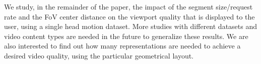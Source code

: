 We study, in the remainder of the paper, the impact of the segment size/request rate and the FoV center distance on the viewport quality that is displayed to the user, using a single head motion dataset. More studies with different datasets and video content types are needed in the future to generalize these results. We are also interested to find out how many representations are needed to achieve a desired video quality, using the particular geometrical layout.
